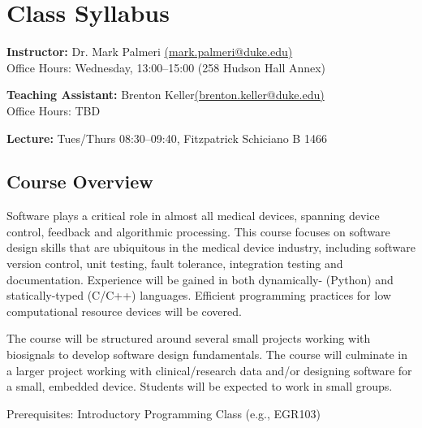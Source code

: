 



\section*{Class Syllabus}

{\bf Instructor:} Dr. Mark Palmeri \href{mailto:mark.palmeri@duke.edu}{(mark.palmeri@duke.edu)}\\
Office Hours: Wednesday, 13:00--15:00 (258 Hudson Hall Annex)

{\bf Teaching Assistant:} Brenton Keller\href{mailto:brenton.keller@duke.edu}{(brenton.keller@duke.edu)}\\
Office Hours: TBD

{\bf Lecture:} Tues/Thurs 08:30--09:40, Fitzpatrick Schiciano B 1466

\subsection*{Course Overview}
Software plays a critical role in almost all medical devices, spanning device control, feedback and algorithmic processing.  This course focuses on software design skills that are ubiquitous in the medical device industry, including software version control, unit testing, fault tolerance, integration testing and documentation.  Experience will be gained in both dynamically- (Python) and statically-typed (C/C++) languages.  Efficient programming practices for low computational resource devices will be covered.

The course will be structured around several small projects working with biosignals to develop software design fundamentals.  The course will culminate in a larger project working with clinical/research data and/or designing software for a small, embedded device.  Students will be expected to work in small groups.

Prerequisites: Introductory Programming Class (e.g., EGR103)

